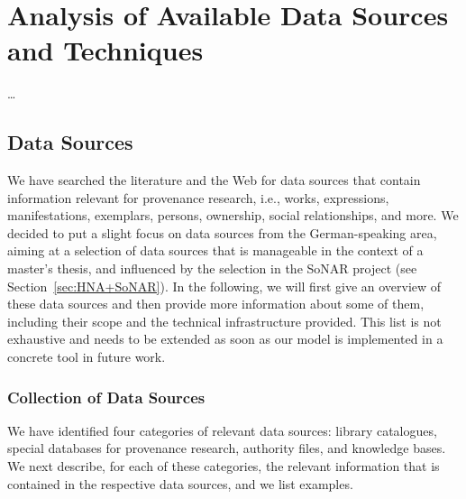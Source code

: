 \chapter{Analysis of Available Data Sources and Techniques}
\label{chap:analysis}

\dots


\section{Data Sources}
\label{sec:data_sources}

We have searched the literature and the Web for data sources that contain information
relevant for provenance research, i.e., works, expressions, manifestations, exemplars,
persons, ownership, social relationships, and more. 
We decided to put a slight focus on data sources from the German-speaking area, 
aiming at a selection of data sources that is manageable in the context of a master's thesis,
and influenced by the selection in the \gls{SoNAR} project (see Section~\ref{sec:HNA+SoNAR}).
In the following, we will first give an overview of these data sources
and then provide more information about some of them,
including their scope and the technical infrastructure provided.
This list is not exhaustive and needs to be extended
as soon as our model is implemented in a concrete tool in future work.

\subsection{Collection of Data Sources}

We have identified four categories of relevant data sources:
library catalogues, special databases for provenance research, authority files, and knowledge bases.
We next describe, for each of these categories, the relevant information that is
contained in the respective data sources, and we list examples.

